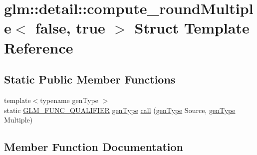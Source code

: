 \hypertarget{structglm_1_1detail_1_1compute__round_multiple_3_01false_00_01true_01_4}{}\section{glm\+:\+:detail\+:\+:compute\+\_\+round\+Multiple$<$ false, true $>$ Struct Template Reference}
\label{structglm_1_1detail_1_1compute__round_multiple_3_01false_00_01true_01_4}
\subsection*{Static Public Member Functions}
\begin{DoxyCompactItemize}
\item 
{\footnotesize template$<$typename gen\+Type $>$ }\\static \mbox{\hyperlink{setup_8hpp_a33fdea6f91c5f834105f7415e2a64407}{G\+L\+M\+\_\+\+F\+U\+N\+C\+\_\+\+Q\+U\+A\+L\+I\+F\+I\+ER}} \mbox{\hyperlink{structglm_1_1detail_1_1gen_type}{gen\+Type}} \mbox{\hyperlink{structglm_1_1detail_1_1compute__round_multiple_3_01false_00_01true_01_4_a9f9791732bf5427c856feac9fed810da}{call}} (\mbox{\hyperlink{structglm_1_1detail_1_1gen_type}{gen\+Type}} Source, \mbox{\hyperlink{structglm_1_1detail_1_1gen_type}{gen\+Type}} Multiple)
\end{DoxyCompactItemize}


\subsection{Member Function Documentation}
\mbox{\label{structglm_1_1detail_1_1compute__round_multiple_3_01false_00_01true_01_4_a9f9791732bf5427c856feac9fed810da}} 
